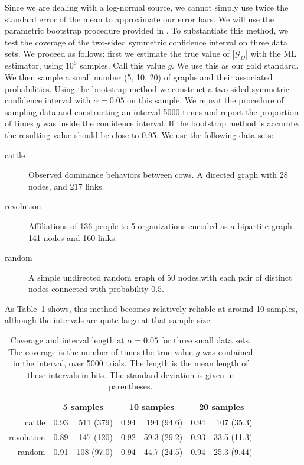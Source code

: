 \documentclass[twoside,11pt]{article}
\newcommand{\cG}{{\mathcal G}}
\begin{document}
Since we are dealing with a log-normal source, we cannot simply use twice the standard error of the mean to approximate our error bars. We will use the parametric bootstrap procedure provided in \citep{angus1994bootstrap,zhou1997confidence}. To substantiate this method, we test the coverage of the two-sided symmetric confidence interval on three data sets. We proceed as follows: first we estimate the true value of $|\cG_D|$ with the ML estimator, using $10^6$ samples. Call this value $g$. We use this as our gold standard. We then sample a small number (5, 10, 20) of graphs and their associated probabilities. Using the bootstrap method we construct a two-sided symmetric confidence interval with $\alpha = 0.05$ on this sample. We repeat the procedure of sampling data and constructing an interval 5000 times and report the proportion of times $g$ was inside the confidence interval. If the bootstrap method is accurate, the resulting value should be close to 0.95. We use the following data sets:
  \begin{description}
  \item[cattle] Observed dominance behaviors between cows. A directed graph with 28 nodes, and 217 links. \cite{schein1955social,konect:2015:moreno_cattle}
  \item[revolution] Affiliations of 136 people to 5 organizations encoded as a bipartite graph. 141 nodes and 160 links. \cite{konect:2015:brunson_revolution}
  \item[random] A simple undirected random graph of 50 nodes,with  each pair of distinct nodes connected with probability $0.5$.
  \end{description}
As Table~\ref{table:coverage-experiment} shows, this method becomes relatively reliable at around 10 samples, although the intervals are quite large at that sample size.

\begin{table}
  \begin{center}
  \begin{tabular}{r r r r r r r }
  \hline
   &  \multicolumn{2}{|c|}{5 samples} & \multicolumn{2}{c|}{10 samples}  & \multicolumn{2}{c}{20 samples}  \\
   \hline
  cattle  & 0.93 & 511 (379) & 0.94 & 194 (94.6) & 0.94 & 107 (35.3) \\
  revolution   & 0.89 & 147 (120) & 0.92 & 59.3 (29.2) & 0.93 & 33.5 (11.3) \\
  random  & 0.91 & 108 (97.0) & 0.94 & 44.7 (24.5) & 0.94 & 25.3 (9.44) \\
  \hline
  \end{tabular}
  \end{center}
  

  \caption{Coverage and interval length at $\alpha=0.05$ for three small data sets. The coverage is the number of times the true value $g$ was contained in the interval, over 5000 trials. The length is the mean length of these intervals in bits. The standard deviation is given in parentheses. } 
  \label{table:coverage-experiment}
\end{table}
\end{document}
